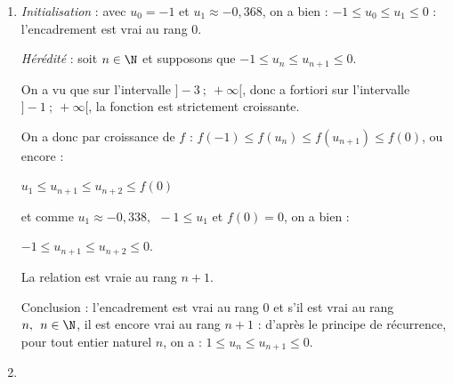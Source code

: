 \begin{enumerate}
\begin{enumerate}
$\bullet~~$Quel que soit le réel $x$, \: $x^2 \geqslant 0$ et $\e^x > 0$, donc le signe de $f'(x)$ est celui de $3 + x$ qui s'annule pour $x = - 3$, d'où les deux intervalles de variations ;

$3 + x < 0 \iff x <- 3$ : sur $]- \infty~;~-3[,\: f'(x) < 0$ : la fonction $f$ est donc décroissante sur $]- \infty~;~- 3[$  ;

$3 + x > 0 \iff x >- 3$ : sur $]- 3~;~+\infty[,\: f'(x) > 0$ : la fonction $f$ est donc croissante sur $]- 3~;~+\infty[$ ;

$f(- 3) = (- 3)^3 \times \e^{-3} = - 27\e^{-3} = - \dfrac{27}{\e^3} \approx - 1,344$ est le minimum de la fonction sur $\R$.

$\bullet~~$ On a $f(0) = 0^3 \times \text{e}^0 = 0 \times 1 = 0$ ;

$\bullet~~$ De $\displaystyle\lim_{x \to + \infty} x^3 = + \infty$ et $\displaystyle\lim_{x \to + \infty} \e^{x} = + \infty$, on a par produit de limites

$\displaystyle\lim_{x \to + \infty} f(x) = + \infty$.
		\item 
		

\emph{Initialisation} : avec $u_0 = - 1$ et $u_1 \approx - 0,368$, on a bien : $ - 1 \leqslant u_0 \leqslant u_1  \leqslant 0$ : l'encadrement est vrai au rang $0$.

\emph{Hérédité} : soit $n \in \N$ et supposons que 	$- 1 \leqslant u_n \leqslant u_{n+1} \leqslant 0$.

On a vu que sur l'intervalle $]- 3~;~+\infty[$, donc a fortiori sur l'intervalle $]- 1~;~+ \infty[$, la fonction est strictement croissante.

On a donc par croissance de $f$ : $f(- 1) \leqslant f\left(u_n\right) \leqslant f\left(u_{n+1}\right)\leqslant f(0)$, ou encore :

$u_1\leqslant u_{n+1} \leqslant u_{n+2} \leqslant f(0)$	

et comme $u_1 \approx -0,338, \: \: - 1 \leqslant u_1$ et $f(0) = 0$, on a bien :

$- 1 \leqslant u_{n+1} \leqslant u_{n+2} \leqslant 0$.

La relation est vraie au rang $n + 1$.

Conclusion : l'encadrement est vrai au rang $0$ et s'il est vrai au rang $n,\:\:n \in \N$, il est encore vrai au rang $n + 1$ : d'après le principe de récurrence, pour tout entier naturel $n$, on a :
$1 \leqslant u_n \leqslant u_{n+1} \leqslant 0$.
		\item 
		

\end{enumerate}
\end{enumerate}
